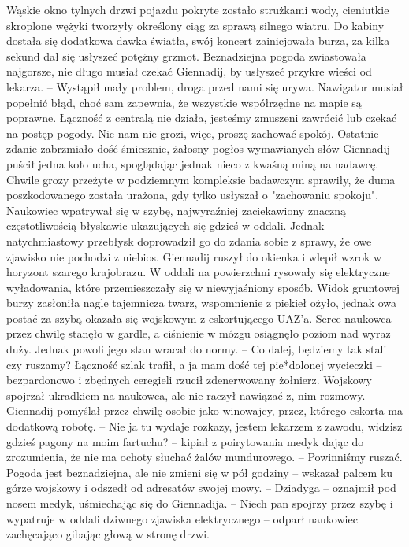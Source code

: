 \documentclass[../MAIN.tex]{subfiles}
\begin{document}
Wąskie okno tylnych drzwi pojazdu pokryte zostało strużkami wody, cieniutkie skroplone wężyki tworzyły określony ciąg za sprawą silnego wiatru. Do kabiny dostała się dodatkowa dawka światła, swój koncert zainicjowała burza, za kilka sekund dał się usłyszeć potężny grzmot. Beznadziejna pogoda zwiastowała najgorsze, nie długo musiał czekać Giennadij, by usłyszeć przykre wieści od lekarza. 
-- Wystąpił mały problem, droga przed nami się urywa. Nawigator musiał popełnić błąd, choć sam zapewnia, że wszystkie współrzędne na mapie są poprawne. Łączność z centralą nie działa, jesteśmy zmuszeni zawrócić lub czekać na postęp pogody. Nic nam nie grozi, więc, proszę zachować spokój. 
Ostatnie zdanie zabrzmiało dość śmiesznie, żałosny pogłos wymawianych słów Giennadij puścił jedna koło ucha, spoglądając jednak nieco z kwaśną miną na nadawcę. Chwile grozy przeżyte w podziemnym kompleksie badawczym sprawiły, że duma poszkodowanego została urażona, gdy tylko usłyszał o "zachowaniu spokoju". 
Naukowiec wpatrywał się w szybę, najwyraźniej zaciekawiony znaczną częstotliwością błyskawic ukazujących się gdzieś w oddali. Jednak natychmiastowy przebłysk doprowadził go do zdania sobie z sprawy, że owe zjawisko nie pochodzi z niebios. Giennadij ruszył do okienka i wlepił wzrok w horyzont szarego krajobrazu. W oddali na powierzchni rysowały się elektryczne wyładowania, które przemieszczały się w niewyjaśniony sposób. Widok gruntowej burzy zasłoniła nagle tajemnicza twarz, wspomnienie z piekieł ożyło, jednak owa postać za szybą okazała się wojskowym z eskortującego UAZ'a. Serce naukowca przez chwilę stanęło w gardle, a ciśnienie w mózgu osiągnęło poziom nad wyraz duży. Jednak powoli jego stan wracał do normy. 
-- Co dalej, będziemy tak stali czy ruszamy? Łączność szlak trafił, a ja mam dość tej pie*dolonej wycieczki -- bezpardonowo i zbędnych ceregieli rzucił zdenerwowany żołnierz. 
Wojskowy spojrzał ukradkiem na naukowca, ale nie raczył nawiązać z, nim rozmowy. Giennadij pomyślał przez chwilę osobie jako winowajcy, przez, którego eskorta ma dodatkową robotę. 
-- Nie ja tu wydaje rozkazy, jestem lekarzem z zawodu, widzisz gdzieś pagony na moim fartuchu? -- kipiał z poirytowania medyk dając do zrozumienia, że nie ma ochoty słuchać żalów mundurowego. 
-- Powinniśmy ruszać. Pogoda jest beznadziejna, ale nie zmieni się w pół godziny -- wskazał palcem ku górze wojskowy i odszedł od adresatów swojej mowy. 
-- Dziadyga -- oznajmił pod nosem medyk, uśmiechając się do Giennadija. 
-- Niech pan spojrzy przez szybę i wypatruje w oddali dziwnego zjawiska elektrycznego -- odparł naukowiec zachęcająco gibając głową w stronę drzwi. 
\end{document}
